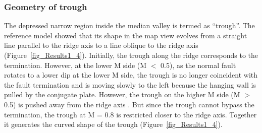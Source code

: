 \subsubsection{Geometry of trough}

The depressed narrow region inside the median valley is termed as ``trough''. The reference model showed that its shape in the map view evolves from a straight line parallel to the ridge axis to a line oblique to the ridge axis (Figure~\hyperref[fig_Results1_4]{\ref{fig_Results1_4}}). Initially, the trough along the ridge corresponds to the termination. However, at the lower M side (M $<$ 0.5), as the normal fault rotates to a lower dip at the lower M side, the trough is no longer coincident with the fault termination and is moving slowly to the left because the hanging wall is pulled by the conjugate plate. %
However, the trough on the higher M side (M $>$ 0.5) is pushed away from the ridge axis \citep{Tucholke2008}. But since the trough cannot bypass the termination, the trough at M = 0.8 is restricted closer to the ridge axis. Together it generates the curved shape of the trough (Figure~\hyperref[fig_Results1_4]{\ref{fig_Results1_4}}). 


